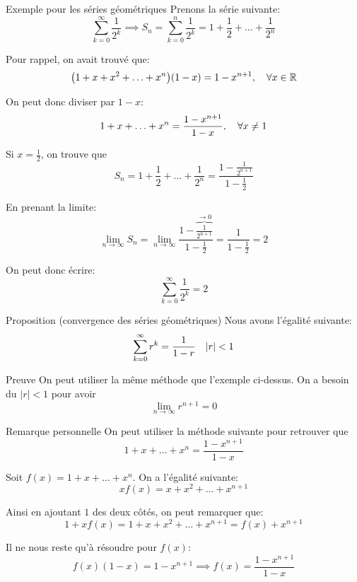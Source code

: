 \documentclass[a4paper]{article}
\begin{document}
\begin{parag}{Exemple pour les séries géométriques}
    Prenons la série suivante: 
    \[\sum_{k=0}^{\infty} \frac{1}{2^{k}} \implies S_n = \sum_{k=0}^{n} \frac{1}{2^{k}} = 1 + \frac{1}{2} + \ldots + \frac{1}{2^{n}}\]
    
    Pour rappel, on avait trouvé que: 
    \[\left(1 + x + x^2 + \ldots + x^{n}\right)\left(1 - x\right) = 1 - x^{n+1}, \mathspace \forall x \in \mathbb{R}\]
    
    On peut donc diviser par $1-x$: 
    \[1 + x + \ldots + x^{n} = \frac{1 - x^{n+1}}{1 - x}, \quad \forall x \neq 1\]
    
    Si $x = \frac{1}{2}$, on trouve que 
    \[S_n = 1 + \frac{1}{2} + \ldots + \frac{1}{2^{n}} = \frac{1 - \frac{1}{2^{n+1}}}{1 - \frac{1}{2}}\]
    
    En prenant la limite: 
    \[\lim_{n \to \infty} S_n = \lim_{n \to \infty} \frac{1 - \overbrace{\frac{1}{2^{n+1}}}^{\to 0}}{1 - \frac{1}{2}} = \frac{1}{1 - \frac{1}{2}} = 2\]
    
    On peut donc écrire: 
    \[\sum_{k=0}^{\infty} \frac{1}{2^{k}} = 2\]
    
\end{parag}

\begin{parag}{Proposition (convergence des séries géométriques)}
    Nous avons l'égalité suivante: 
    \[\sum_{k=0}^{\infty} r^{k} = \frac{1}{1 - r} \mathspace \left|r\right| < 1\]
    
    \begin{subparag}{Preuve}
        On peut utiliser la même méthode que l'exemple ci-dessus. On a besoin du $\left|r\right| < 1$ pour avoir 
        \[\lim_{n \to \infty} r^{n+1} = 0\]
        
    \end{subparag}
    
    \begin{subparag}{Remarque personnelle}
        On peut utiliser la méthode suivante pour retrouver que 
        \[1 + x + \ldots + x^{n} = \frac{1 - x^{n + 1}}{1-x}\]
        

        Soit $f\left(x\right) = 1 + x + \ldots + x^{n}$. On a l'égalité suivante: 
        \[xf\left(x\right) = x + x^2 + \ldots + x^{n+1}\]
        
        Ainsi en ajoutant $1$ des deux côtés, on peut remarquer que:
        \[1 + xf\left(x\right) = 1 + x + x^2 + \ldots + x^{n+1} = f\left(x\right) + x^{n+1}\]

        Il ne nous reste qu'à résoudre pour $f\left(x\right)$: 
        \[f\left(x\right)\left(1 - x\right) = 1 - x^{n+1} \implies f\left(x\right) = \frac{1 - x^{n+1}}{1 - x}\]
        
    \end{subparag}
    
    
\end{parag}
\end{document}
